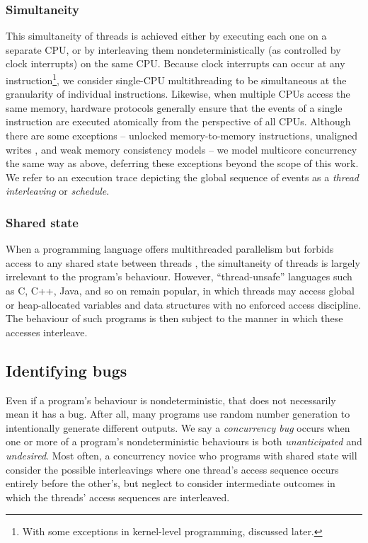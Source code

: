 \subsubsection{Simultaneity}
This simultaneity of threads is achieved either by executing each one on a separate CPU, or by interleaving them nondeterministically (as controlled by clock interrupts) on the same CPU.
Because clock interrupts can occur at any instruction\footnote{
	With some exceptions in kernel-level programming, discussed later.
},
we consider single-CPU multithreading to be simultaneous at the granularity of individual instructions.
%
Likewise, when multiple CPUs access the same memory,
hardware protocols generally ensure that the events of a single instruction are executed atomically from the perspective of all CPUs.
Although there are some exceptions --
unlocked memory-to-memory instructions,
unaligned writes \cite{unaligned-writes},
and weak memory consistency models \cite{memory-consistency-models} --
we model multicore concurrency the same way as above,
deferring these exceptions beyond the scope of this work.
We refer to an execution trace depicting the global sequence of events as a {\em thread interleaving} or {\em schedule}.

\subsubsection{Shared state}
When a programming language offers multithreaded parallelism but forbids access to any shared state between threads \cite{rust-language},
the simultaneity of threads is largely irrelevant to the program's behaviour.
However, ``thread-unsafe'' languages such as C, C++, Java, and so on remain popular,
in which threads may access global or heap-allocated variables and data structures with no enforced access discipline.
The behaviour of such programs is then subject to the manner in which these accesses interleave.

\subsection{Identifying bugs}

Even if a program's behaviour is nondeterministic, that does not necessarily mean it has a bug.
After all, many programs use random number generation to intentionally generate different outputs.
We say a {\em concurrency bug} occurs when one or more of a program's nondeterministic behaviours is both {\em unanticipated} and {\em undesired}.
Most often, a concurrency novice who programs with shared state will consider the possible interleavings where one thread's access sequence occurs entirely before the other's, but neglect to consider intermediate outcomes in which the threads' access sequences are interleaved.

